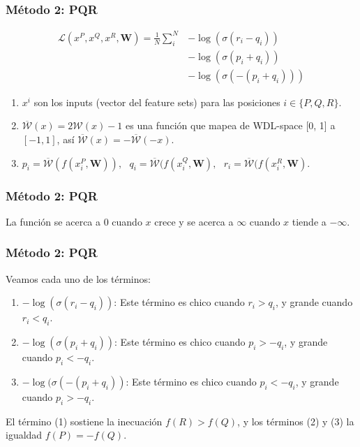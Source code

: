 \begin{frame}
\frametitle{Método 2: PQR}
\begin{align*}
\mathcal{L}(x^P, x^Q, x^R, \bm{W})=
\frac{1}{N}
\sum_i^N
& -\log\left(\sigma(r_i - q_i)\right) \\
& -\log\left(\sigma(p_i + q_i)\right) \\
& -\log\left(\sigma(-(p_i + q_i))\right)
\end{align*}
\begin{enumerate}
\itemsep0em
\item $x^i$ son los inputs (vector del feature sets) para las posiciones $i \in \{P,Q,R\}$.
\item $\overline{\mathcal{W}}(x) = 2 \mathcal{W}(x) - 1$ es una función que mapea de WDL-space [0, 1] a $[-1, 1]$, así $\overline{\mathcal{W}}(x) = -\overline{\mathcal{W}}(-x)$.
\item $
p_i = \overline{\mathcal{W}}(f(x^P_i, \bm{W})),\text{ }
q_i = \overline{\mathcal{W}}(f(x^Q_i, \bm{W}),\text{ }
r_i = \overline{\mathcal{W}}(f(x^R_i, \bm{W})
$.
\end{enumerate}
\end{frame}


\begin{frame}
\frametitle{Método 2: PQR}
\begin{figure}[H]
\centering
{}
\end{figure}
La función se acerca a 0 cuando $x$ crece y se acerca a $\infty$ cuando $x$ tiende a $-\infty$.
\end{frame}

\begin{frame}
\frametitle{Método 2: PQR}
Veamos cada uno de los términos:
\begin{enumerate}
\itemsep0em
\item $-\log(\sigma(r_i - q_i))$: Este término es chico cuando $r_i > q_i$, y grande cuando $r_i < q_i$.
\item $-\log(\sigma(p_i + q_i))$: Este término es chico cuando $p_i > -q_i$, y grande cuando $p_i < -q_i$.
\item $-\log(\sigma(-(p_i + q_i))$: Este término es chico cuando $p_i < -q_i$, y grande cuando $p_i > -q_i$.
\end{enumerate}

El término (1) sostiene la inecuación $f(R) > f(Q)$, y los términos (2) y (3) la igualdad $f(P) = -f(Q)$.
\end{frame}

